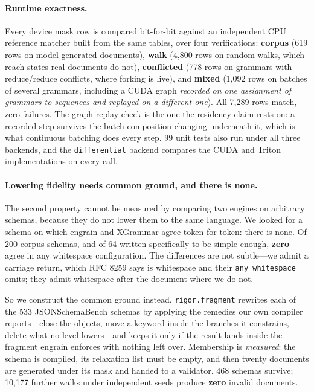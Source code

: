 \documentclass{article}
\begin{document}
\paragraph{Runtime exactness.} Every device mask row is compared bit-for-bit
against an independent CPU reference matcher built from the same tables, over
four verifications: \textbf{corpus} (619 rows on model-generated documents),
\textbf{walk} (4{,}800 rows on random walks, which reach states real documents
do not), \textbf{conflicted} (778 rows on grammars with reduce/reduce
conflicts, where forking is live), and \textbf{mixed} (1{,}092 rows on batches
of several grammars, including a CUDA graph \emph{recorded on one assignment of
grammars to sequences and replayed on a different one}). All 7{,}289 rows match,
zero failures. The graph-replay check is the one the residency claim rests on:
a recorded step survives the batch composition changing underneath it, which is
what continuous batching does every step. 99 unit tests also run under all
three backends, and the \texttt{differential} backend compares the CUDA and
Triton implementations on every call.

\paragraph{Lowering fidelity needs common ground, and there is none.}
The second property cannot be measured by comparing two engines on arbitrary
schemas, because they do not lower them to the same language. We looked for a
schema on which engrain and XGrammar agree token for token: there is none. Of
200 corpus schemas, and of 64 written specifically to be simple enough,
\textbf{zero} agree in any whitespace configuration. The differences are not
subtle---we admit a carriage return, which RFC 8259 says is whitespace and
their \texttt{any\_whitespace} omits; they admit whitespace after the document
where we do not.

So we construct the common ground instead. \texttt{rigor.fragment} rewrites
each of the 533 JSONSchemaBench schemas by applying the remedies our own
compiler reports---close the objects, move a keyword inside the branches it
constrains, delete what no level lowers---and keeps it only if the result lands
inside the fragment engrain enforces with nothing left over. Membership is
\emph{measured}: the schema is compiled, its relaxation list must be empty, and
then twenty documents are generated under its mask and handed to a validator.
468 schemas survive; 10{,}177 further walks under independent seeds produce
\textbf{zero} invalid documents.
\end{document}
